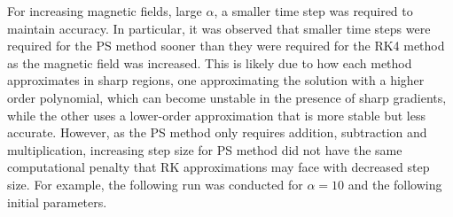 \documentclass{article}
\begin{document}
        
    
For increasing magnetic fields, large $\alpha$, a smaller time step was required to maintain accuracy. In particular, it was observed that smaller time steps were required for the PS method sooner than they were required for the RK4 method as the magnetic field was increased. This is likely due to how each method approximates in sharp regions, one approximating the solution with a higher order polynomial, which can become unstable in the presence of sharp gradients, while the other uses a lower-order approximation that is more stable but less accurate. However, as the PS method only requires addition, subtraction and multiplication, increasing step size for PS method did not have the same computational penalty that RK approximations may face with decreased step size. For example, the following run was conducted for $\alpha=10$  and the following initial parameters.\\
\end{document}
